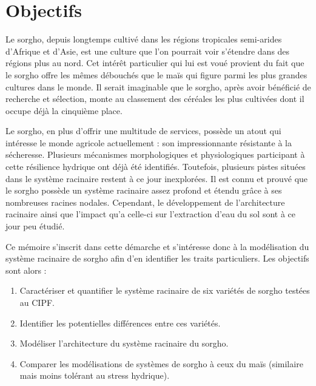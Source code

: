 \section{Objectifs}

Le sorgho, depuis longtemps cultivé dans les régions tropicales semi-arides d'Afrique et d'Asie, est une culture que l'on pourrait voir s'étendre dans des régions plus au nord.
Cet intérêt particulier qui lui est voué provient du fait que le sorgho offre les mêmes débouchés que le maïs qui figure parmi les plus grandes cultures dans le monde.
Il serait imaginable que le sorgho, après avoir bénéficié de recherche et sélection, monte au classement des céréales les plus cultivées dont il occupe déjà la cinquième place.
\newline

Le sorgho, en plus d'offrir une multitude de services, possède un atout qui intéresse le monde agricole actuellement : son impressionnante résistante à la sécheresse.
Plusieurs mécanismes morphologiques et physiologiques participant à cette résilience hydrique ont déjà été identifiés.
Toutefois, plusieurs pistes situées dans le système racinaire restent à ce jour inexplorées.
Il est connu et prouvé que le sorgho possède un système racinaire assez profond et étendu grâce à ses nombreuses racines nodales.
Cependant, le développement de l'architecture racinaire ainsi que l'impact qu'a celle-ci sur l'extraction d'eau du sol sont à ce jour peu étudié.
\newline

Ce mémoire s'inscrit dans cette démarche et s'intéresse donc à la modélisation du système racinaire de sorgho afin d'en identifier les traits particuliers.
Les objectifs sont alors :
\begin{enumerate}
    \item Caractériser et quantifier le système racinaire de six variétés de sorgho testées au CIPF. 
    \item Identifier les potentielles différences entre ces variétés.
    \item Modéliser l'architecture du système racinaire du sorgho.
    \item Comparer les modélisations de systèmes de sorgho à ceux du maïs (similaire mais moins tolérant au stress hydrique).
\end{enumerate}

